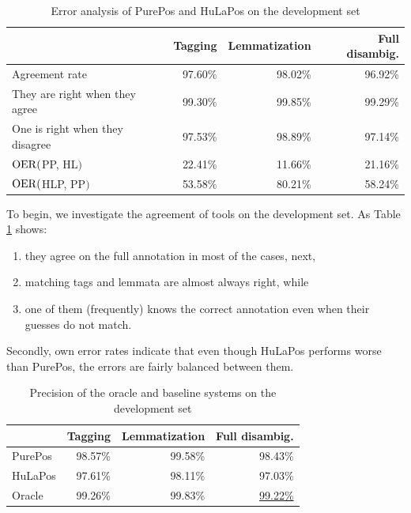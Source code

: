 \begin{table}[H]
\centering
\caption{Error analysis of PurePos and HuLaPos on the development set}\label{tab:comb-disambig-comp}
\begin{tabular}{l r r r}
\hline
& Tagging & Lemmatization & Full disambig. \\
\hline
Agreement rate & 97.60\% & 98.02\% & 96.92\% \\
They are right when they agree & 99.30\% & 99.85\% & 99.29\% \\
One is right when they disagree & 97.53\% & 98.89\% & 97.14\% \\
$\operatorname{OER}($PP, HL$)$ & 22.41\% & 11.66\% & 21.16\% \\
$\operatorname{OER}($HLP, PP$)$ & 53.58\% & 80.21\% & 58.24\% \\
\hline
\end{tabular}
\end{table}

To begin, we investigate the agreement of tools on the development set.
As Table \ref{tab:comb-disambig-comp} shows:
\begin{enumerate}
 \item they agree on the full annotation in most of the cases, next,
 \item matching tags and lemmata are almost always right, while
 \item one of them (frequently) knows the correct annotation even when their guesses do not match.
\end{enumerate}

Secondly, own error rates indicate that even though HuLaPos performs worse than PurePos, the errors are fairly balanced between them. 

\begin{table}[H]
\centering
\caption{Precision of the oracle and baseline systems on the development set}\label{tab:comb-disambig-acc}
\begin{tabular}{l r r r}
\hline
& Tagging & Lemmatization & Full disambig. \\
\hline
PurePos & 98.57\% & 99.58\% & 98.43\% \\
HuLaPos & 97.61\% & 98.11\% & 97.03\% \\
Oracle & 99.26\% & 99.83\% & \underline{99.22\%} \\
\hline
\end{tabular}
\end{table}

